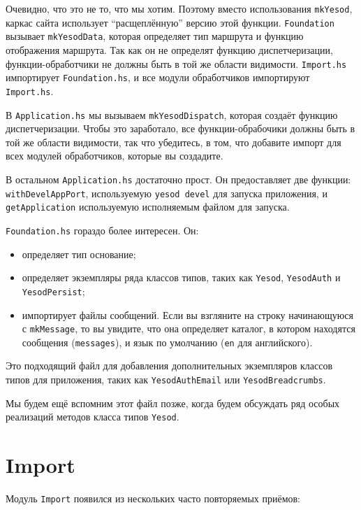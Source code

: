 Очевидно, что это не то, что мы хотим. Поэтому вместо использования \lstinline!mkYesod!, каркас 
сайта использует ``расщеплённую'' версию этой функции. \lstinline!Foundation! вызывает \lstinline!mkYesodData!,
которая определяет тип маршрута и функцию отображения маршрута. Так как он не определят функцию диспетчеризации,
функции-обработчики не должны быть в той же области видимости. \lstinline!Import.hs! импортирует
\lstinline!Foundation.hs!, и все модули обработчиков импортируют \lstinline!Import.hs!.

В \lstinline!Application.hs! мы вызываем \lstinline!mkYesodDispatch!, которая создаёт функцию диспетчеризации.
Чтобы это заработало, все функции-обрабочики должны быть в той же области видимости, так что убедитесь, в 
том, что добавите импорт для всех модулей обработчиков, которые вы создадите.

В остальном \lstinline!Application.hs! достаточно прост. Он предоставляет две функции:
\lstinline!withDevelAppPort!, используемую \lstinline!yesod devel! для запуска приложения,
и \lstinline!getApplication! используемую исполняемым файлом для запуска.

\lstinline!Foundation.hs! гораздо более интересен. Он:
\begin{itemize}
  \item определяет тип основание;
  \item определяет экземпляры ряда классов типов, таких как \lstinline!Yesod!, \lstinline!YesodAuth! и \lstinline!YesodPersist!;
  \item импортирует файлы сообщений. Если вы взгляните на строку начинающуюся с \lstinline!mkMessage!,
    то вы увидите, что она определяет каталог, в котором находятся сообщения (\lstinline!messages!),
    и язык по умолчанию (\lstinline!en! для английского).
\end{itemize}

Это подходящий файл для добавления дополнительных экземпляров классов типов для приложения,
таких как \lstinline!YesodAuthEmail! или \lstinline!YesodBreadcrumbs!.

Мы будем ещё вспомним этот файл позже, когда будем обсуждать ряд особых реализаций
методов класса типов \lstinline!Yesod!.

\section{Import}

Модуль \lstinline!Import! появился из нескольких часто повторяемых приёмов:

